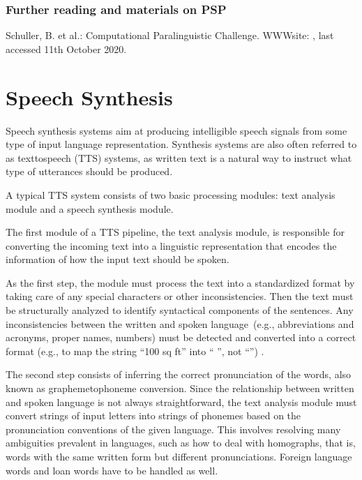 \documentclass[letterpaper,10pt,english]{jupyterBook}
\begin{document}
\subsection{Further reading and materials on PSP}
\label{\detokenize{Recognition/Paralinguistic_speech_processing:further-reading-and-materials-on-psp}}
\sphinxAtStartPar


\sphinxAtStartPar
Schuller, B. et al.: Computational Paralinguistic Challenge. WWW\sphinxhyphen{}site:
, last accessed 11th October 2020.

\sphinxstepscope


\chapter{Speech Synthesis}
\label{\detokenize{Speech_Synthesis:speech-synthesis}}\label{\detokenize{Speech_Synthesis::doc}}
\sphinxAtStartPar
Speech synthesis systems aim at producing intelligible speech signals
from some type of input language representation. Synthesis systems are
also often referred to as text\sphinxhyphen{}to\sphinxhyphen{}speech (TTS) systems, as written text
is a natural way to instruct what type of utterances should be produced.

\sphinxAtStartPar
A typical TTS system consists of two basic processing modules: text
analysis module and a speech synthesis module.

\sphinxAtStartPar
{}

\sphinxAtStartPar
The first module of a TTS pipeline, the text analysis module, is
responsible for converting the incoming text into a linguistic
representation that encodes the information of how the input text should
be spoken.

\sphinxAtStartPar
As the first step, the module must process the text into a standardized
format by taking care of any special characters or other
inconsistencies. Then the text must be structurally analyzed to identify
syntactical components of the sentences. Any inconsistencies between the
written and spoken language (e.g., abbreviations and acronyms, proper
names, numbers) must be detected and converted into a correct format
(e.g., to map the string “100 sq ft” into “ ”,
not “”) .

\sphinxAtStartPar
The second step consists of inferring the correct pronunciation of the
words, also known as grapheme\sphinxhyphen{}to\sphinxhyphen{}phoneme conversion. Since the
relationship between written and spoken language is not always
straightforward, the text analysis module must convert strings of input
letters into strings of phonemes based on the pronunciation conventions
of the given language. This involves resolving many ambiguities
prevalent in languages, such as how to deal with homographs, that is,
words with the same written form but different pronunciations. Foreign
language words and loan words have to be handled as well.
\end{document}
